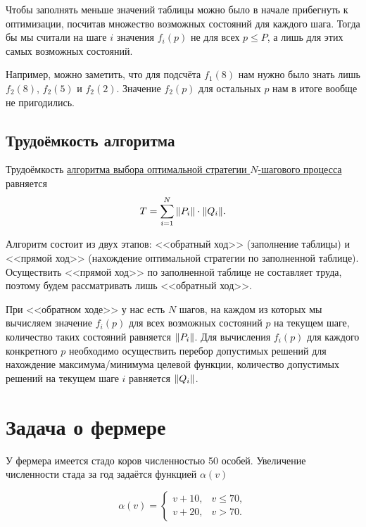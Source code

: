 \remark

Чтобы заполнять меньше значений таблицы можно было в начале прибегнуть к оптимизации, посчитав множество возможных состояний для каждого шага. Тогда бы мы считали на шаге $i$ значения $f_i(p)$ не для всех $p \le P$, а лишь для этих самых возможных состояний.

Например, можно заметить, что для подсчёта $f_1(8)$ нам нужно было знать лишь $f_2(8)$, $f_2(5)$ и $f_2(2)$. Значение $f_2(p)$ для остальных $p$ нам в итоге вообще не пригодились.

\subsection{Трудоёмкость алгоритма}

\fact\label{fact:n_step_complexity}

Трудоёмкость \hyperref[alg:opt_strategy]{алгоритма выбора оптимальной стратегии $N$-шагового процесса} равняется
\[
T = \sum_{i=1}^{N} \norm{P_i} \cdot \norm{Q_i}.
\]

\prooof

Алгоритм состоит из двух этапов: <<обратный ход>> (заполнение таблицы) и <<прямой ход>> (нахождение оптимальной стратегии по заполненной таблице). Осуществить <<прямой ход>> по заполненной таблице не составляет труда, поэтому будем рассматривать лишь <<обратный ход>>.

При <<обратном ходе>> у нас есть $N$ шагов, на каждом из которых мы вычисляем значение $f_i(p)$ для всех возможных состояний $p$ на текущем шаге, количество таких состояний равняется $\norm{P_i}$. Для вычисления $f_i(p)$ для каждого конкретного $p$ необходимо осуществить перебор допустимых решений для нахождение максимума/минимума целевой функции, количество допустимых решений на текущем шаге $i$ равняется $\norm{Q_i}$.


\section{Задача о фермере}

\problem[о фермере]

У фермера имеется стадо коров численностью 50 особей. Увеличение численности стада за год задаётся функцией $\alpha(v)$

\[
\alpha(v) = \begin{cases}
	v + 10,& v \le 70, \\
	v + 20,& v > 70.
\end{cases}
\]

